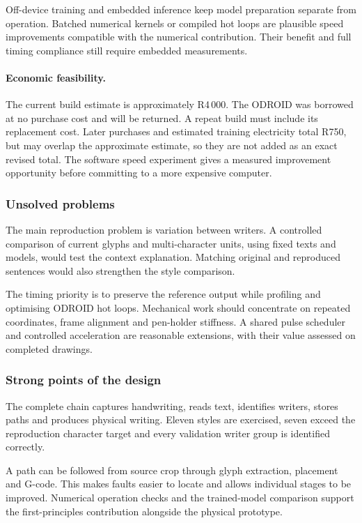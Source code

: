 Off-device training and embedded inference keep model preparation separate from operation. Batched numerical kernels or compiled hot loops are plausible speed improvements compatible with the numerical contribution. Their benefit and full timing compliance still require embedded measurements.

\paragraph{Economic feasibility.}
The current build estimate is approximately R4\,000. The ODROID was borrowed at no purchase cost and will be returned. A repeat build must include its replacement cost. Later purchases and estimated training electricity total R750, but may overlap the approximate estimate, so they are not added as an exact revised total. The software speed experiment gives a measured improvement opportunity before committing to a more expensive computer.

\subsubsection{Unsolved problems}
\label{sec:dis-unsolved}
The main reproduction problem is variation between writers. A controlled comparison of current glyphs and multi-character units, using fixed texts and models, would test the context explanation. Matching original and reproduced sentences would also strengthen the style comparison.

The timing priority is to preserve the reference output while profiling and optimising ODROID hot loops. Mechanical work should concentrate on repeated coordinates, frame alignment and pen-holder stiffness. A shared pulse scheduler and controlled acceleration are reasonable extensions, with their value assessed on completed drawings.

\subsubsection{Strong points of the design}
\label{sec:dis-strengths}
The complete chain captures handwriting, reads text, identifies writers, stores paths and produces physical writing. Eleven styles are exercised, seven exceed the reproduction character target and every validation writer group is identified correctly.

A path can be followed from source crop through glyph extraction, placement and G-code. This makes faults easier to locate and allows individual stages to be improved. Numerical operation checks and the trained-model comparison support the first-principles contribution alongside the physical prototype.

